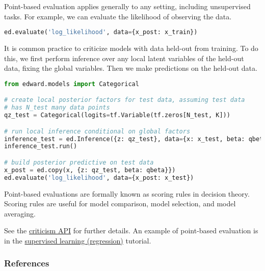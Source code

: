 Point-based evaluation applies generally to any setting, including
unsupervised tasks. For example, we can evaluate the likelihood of
observing the data.
\begin{lstlisting}[language=Python]
ed.evaluate('log_likelihood', data={x_post: x_train})
\end{lstlisting}

It is common practice to criticize models with data held-out from
training. To do this, we first perform inference over any local latent
variables of the held-out data, fixing the global variables.  Then we
make predictions on the held-out data.

\begin{lstlisting}[language=Python]
from edward.models import Categorical

# create local posterior factors for test data, assuming test data
# has N_test many data points
qz_test = Categorical(logits=tf.Variable(tf.zeros[N_test, K]))

# run local inference conditional on global factors
inference_test = ed.Inference({z: qz_test}, data={x: x_test, beta: qbeta})
inference_test.run()

# build posterior predictive on test data
x_post = ed.copy(x, {z: qz_test, beta: qbeta}})
ed.evaluate('log_likelihood', data={x_post: x_test})
\end{lstlisting}

Point-based evaluations are formally known as scoring rules
in decision theory. Scoring rules are useful for model comparison, model
selection, and model averaging.

See the \href{/api/criticism}{criticism API} for further details.
An example of point-based evaluation is in the
\href{/tutorials/supervised-regression}{supervised learning
(regression)} tutorial.

\subsubsection{References}\label{references}
